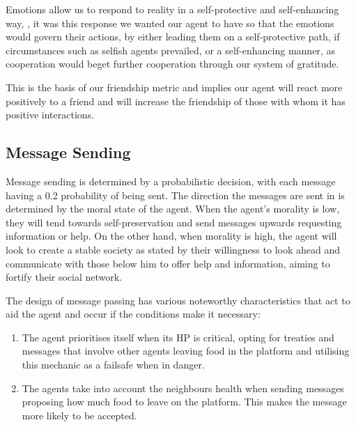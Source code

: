 Emotions allow us to respond to reality in a self-protective and self-enhancing way, \cite{ekman_1992}, it was this response we wanted our agent to have so that the emotions would govern their actions, by either leading them on a self-protective path, if circumstances such as selfish agents prevailed, or a self-enhancing manner, as cooperation would beget further cooperation through our system of gratitude.\par 
This is the basis of our friendship metric and implies our agent will react more positively to a friend and will increase the friendship of those with whom it has positive interactions.

\subsection{Message Sending}
Message sending is determined by a probabilistic decision, with each message having a 0.2 probability of being sent. The direction the messages are sent in is determined by the moral state of the agent. When the agent's morality is low, they will tend towards self-preservation and send messages upwards requesting information or help. On the other hand, when morality is high, the agent will look to create a stable society as stated by their willingness to look ahead and communicate with those below him to offer help and information, aiming to fortify their social network.\par 
The design of message passing has various noteworthy characteristics that act to aid the agent and occur if the conditions make it necessary: 
\begin{enumerate}
    \item The agent prioritises itself when its HP is critical, opting for treaties and messages that involve other agents leaving food in the platform and utilising this mechanic as a failsafe when in danger.
    \item The agents take into account the neighbours health when sending messages proposing how much food to leave on the platform. This makes the message more likely to be accepted. 
\end{enumerate}

